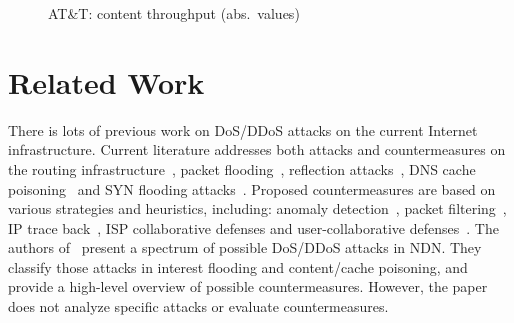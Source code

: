 \documentclass[10pt,conference,letterpaper]{IEEEtran}
\begin{document}
\begin{comment}
\begin{figure*}[t]
 \centering
 \subfigure[R9: baseline]
   {\texttt{[image: Images/dfn\_bandwidth\_cr9\_contents\_baseline]}\label{DFN-routers-selection-R9-base}}
 \subfigure[R9: attack]
   {\texttt{[image: Images/dfn\_bandwidth\_cr9\_contents\_attackers3]}\label{DFN-routers-selection-R9-att}}
 \subfigure[R9: rate-based countermeasure]
   {\texttt{[image: Images/dfn\_bandwidth\_cr9\_contents\_simple]}\label{DFN-routers-selection-R9-count}}
 \hspace{5mm}
\caption{DFN: content throughput (abs. values)}
\label{fig:DFN-routers-selection}
 \end{figure*}
\end{comment}





\begin{figure*}[htp!]
 \centering
 \hspace{1mm}
 \hspace{1mm}
   \caption{AT\&T: content throughput  (abs.~values)}
\label{fig:ATT-routers-selection}
 \end{figure*}














\section{Related Work}
\label{relatedwork}



There is lots of previous work on DoS/DDoS attacks on the current Internet  
infrastructure. Current literature addresses both attacks
and countermeasures on the routing infrastructure~\cite{routing-dos},
packet flooding~\cite{packet-flooding}, reflection
attacks~\cite{reflection-attacks}, DNS cache
poisoning~\cite{And05perilsof} and SYN flooding
attacks~\cite{Wang02detectingsyn}. Proposed 
countermeasures are based on various
strategies and heuristics, including: anomaly
detection~\cite{Carl:2006:DAT:1110639.1110699},  
packet 
filtering~\cite{Tupakula:2003:PMC:783106.783137}, IP trace
back~\cite{Lu:2008:GMP:1368310.1368337,Stone:2000:CIO:1251306.1251321},
ISP collaborative defenses \cite{DBLP:journals/tpds/ChenHK07} and user-collaborative defenses~\cite{GkantsidisR06}.
The authors of~\cite{ndn-dos} present a spectrum of possible DoS/DDoS attacks in NDN. They classify those attacks in interest flooding and content/cache poisoning, and provide a high-level overview of possible countermeasures. However, the paper does not analyze specific attacks or evaluate countermeasures. 
\end{document}
